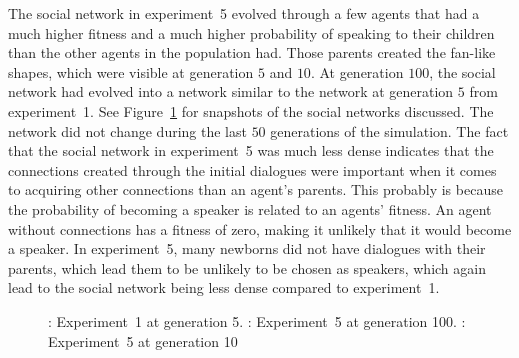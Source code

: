 The social network in experiment~5 evolved through a few agents that had a much higher fitness and a much higher probability of speaking to their children than the other agents in the population had. Those parents created the fan-like shapes, which were visible at generation $5$ and $10$. At generation $100$, the social network had evolved into a network similar to the network at generation $5$ from experiment~1. See Figure~\ref{fig:SNComparison} for snapshots of the social networks discussed. The network did not change during the last $50$ generations of the simulation. The fact that the social network in experiment~5 was much less dense indicates that the connections created through the initial dialogues were important when it comes to acquiring other connections than an agent's parents. This probably is because the probability of becoming a speaker is related to an agents' fitness. An agent without connections has a fitness of zero, making it unlikely that it would become a speaker. In experiment~5, many newborns did not have dialogues with their parents, which lead them to be unlikely to be chosen as speakers, which again lead to the social network being less dense compared to experiment~1.

\begin{figure}
    \centering
    \hfill
    \hfill
    \hfill
    \caption{: Experiment~1 at generation 5. : Experiment~5 at generation 100. : Experiment~5 at generation 10}
    \label{fig:SNComparison}
\end{figure}


